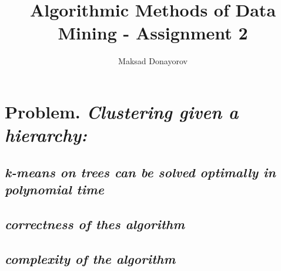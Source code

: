 \documentclass[11pt,a4paper,english]{article}
\title{Algorithmic Methods of Data Mining - Assignment 2}
\author{Maksad Donayorov}
\begin{document}
    \maketitle

    \section{Problem. \textit{Clustering given a hierarchy:}}
      \subsection{
        \textit{k-means on trees can be solved optimally in polynomial time}
      }

      \subsection{
        \textit{correctness of thes algorithm}
      }

      \subsection{
        \textit{complexity of the algorithm}
      }
\end{document}
